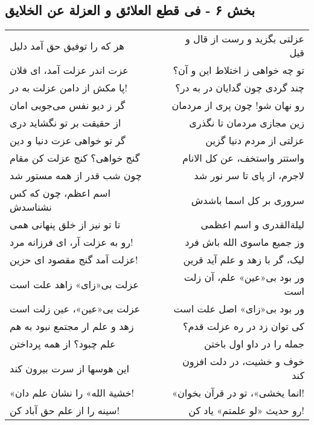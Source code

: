 \begin{center}
\section*{بخش ۶ - فی قطع العلائق و العزلة عن الخلایق}
\label{sec:006}
\begin{longtable}{l p{0.5cm} r}
هر که را توفیق حق آمد دلیل
&&
عزلتی بگزید و رست از قال و قیل
\\
عزت اندر عزلت آمد، ای فلان
&&
تو چه خواهی ز اختلاط این و آن؟
\\
پا مکش از دامن عزلت به در!
&&
چند گردی چون گدایان در به در؟
\\
گر ز دیو نفس می‌جویی امان
&&
رو نهان شو! چون پری از مردمان
\\
از حقیقت بر تو نگشاید دری
&&
زین مجازی مردمان تا نگذری
\\
گر تو خواهی عزت دنیا و دین
&&
عزلتی از مردم دنیا گزین
\\
گنج خواهی؟ کنج عزلت کن مقام
&&
واستتر واستخف، عن کل الانام
\\
چون شب قدر از همه مستور شد
&&
لاجرم، از پای تا سر نور شد
\\
اسم اعظم، چون که کس نشناسدش
&&
سروری بر کل اسما باشدش
\\
تا تو نیز از خلق پنهانی همی
&&
لیلةالقدری و اسم اعظمی
\\
رو به عزلت آر، ای فرزانه مرد!
&&
وز جمیع ماسوی الله باش فرد
\\
عزلت آمد گنج مقصود ای حزین!
&&
لیک، گر با زهد و علم آید قرین
\\
عزلت بی«زای» زاهد علت است
&&
ور بود بی«عین» علم، آن زلت است
\\
عزلت بی«عین»، عین زلت است
&&
ور بود بی«زای» اصل علت است
\\
زهد و علم ار مجتمع نبود به هم
&&
کی توان زد در ره عزلت قدم؟
\\
علم چبود؟ از همه پرداختن
&&
جمله را در داو اول باختن
\\
این هوسها از سرت بیرون کند
&&
خوف و خشیت، در دلت افزون کند
\\
«خشیة الله» را نشان علم دان!
&&
«انما یخشی»، تو در قرآن بخوان!
\\
سینه را از علم حق آباد کن!
&&
رو حدیث «لو علمتم» یاد کن!
\\
\end{longtable}
\end{center}
